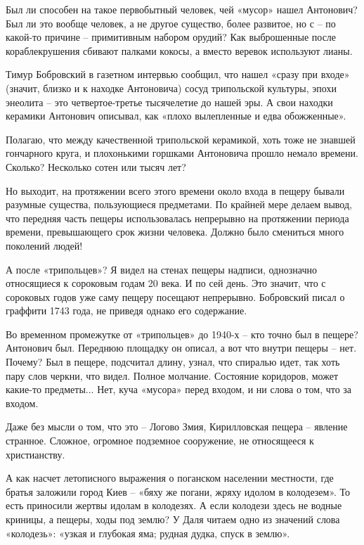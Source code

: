 Был ли способен на такое первобытный человек, чей «мусор» нашел Антонович? Был ли это вообще человек, а не другое существо, более развитое, но с – по какой-то причине – примитивным набором орудий? Как выброшенные после кораблекрушения сбивают палками кокосы, а вместо веревок используют лианы.



Тимур Бобровский в газетном интервью сообщил, что нашел «сразу при входе» (значит, близко и к находке Антоновича) сосуд трипольской культуры, эпохи энеолита – это четвертое-третье тысячелетие до нашей эры. А свои находки керамики Антонович описывал, как «плохо вылепленные и едва обожженные». 

Полагаю, что между качественной трипольской керамикой, хоть тоже не знавшей гончарного круга, и плохонькими горшками Антоновича прошло немало времени. Сколько? Несколько сотен или тысяч лет?

Но выходит, на протяжении всего этого времени около входа в пещеру бывали разумные существа, пользующиеся предметами. По крайней мере делаем вывод, что передняя часть пещеры использовалась непрерывно на протяжении периода времени, превышающего срок жизни человека. Должно было смениться много поколений людей!

А после «трипольцев»? Я видел на стенах пещеры надписи, однозначно относящиеся к сороковым годам 20 века. И по сей день. Это значит, что с сороковых годов уже саму пещеру посещают непрерывно. Бобровский писал о граффити 1743 года, не приведя однако его содержание.

Во временном промежутке от «трипольцев» до 1940-х – кто точно был в пещере? Антонович был. Переднюю площадку он описал, а вот что внутри пещеры – нет. Почему? Был в пещере, подсчитал длину, узнал, что спиралью идет, так хоть пару слов черкни, что видел. Полное молчание. Состояние коридоров, может какие-то предметы... Нет, куча «мусора» перед входом, и ни слова о том, что за входом.

Даже без мысли о том, что это – Логово Змия, Кирилловская пещера – явление странное. Сложное, огромное подземное сооружение, не относящееся к христианству.

А как насчет летописного выражения о поганском населении местности, где братья заложили город Киев – «бяху же погани, жряху идолом в колодезем». То есть приносили жертвы идолам в колодезях. А если колодези здесь не водные криницы, а пещеры, ходы под землю? У Даля читаем одно из значений слова «колодезь»: «узкая и глубокая яма; рудная дудка, спуск в землю». 

